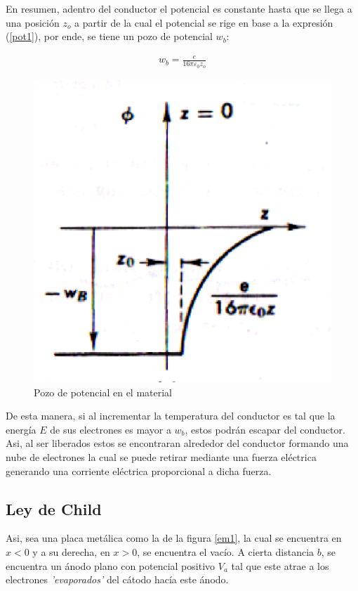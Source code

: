 \documentclass[%
 reprint,
 amsmath,amssymb,
 aps,
]{revtex4-2}
\begin{document}
\vspace{0.2 cm}
En resumen, adentro del conductor el potencial es constante hasta que se llega a una posición $z_o$ a partir de la cual el potencial se rige en base a la expresión (\ref{pot1}), por ende, se tiene un pozo de potencial $w_b$:

\begin{align*}
    w_b = \frac{e}{16\pi \varepsilon_{0}z_o}
\end{align*}

\begin{figure}[H]
    \centering
    \includegraphics[width=0.7\linewidth]{../src/imagenes/pozo.png}
    \caption{Pozo de potencial en el material}
    \label{fig:1}
\end{figure}

\vspace{0.2 cm}
De esta manera, si al incrementar la temperatura del conductor es tal que la energía $E$ de sus electrones es mayor a $w_b$, estos podrán escapar del conductor. Asi, al ser liberados estos se encontraran alrededor del conductor formando una nube de electrones la cual se puede retirar mediante una fuerza eléctrica generando una corriente eléctrica proporcional a dicha fuerza.

\subsection{Ley de Child}
Asi, sea una placa metálica como la de la figura \ref{em1}, la cual se encuentra en $x<0$ y a su derecha, en $x>0$, se encuentra el vacío. A cierta distancia $b$, se encuentra un ánodo plano con potencial positivo $V_{a}$ tal que este atrae a los electrones \textit{'evaporados'} del cátodo hacía este ánodo.
\end{document}
